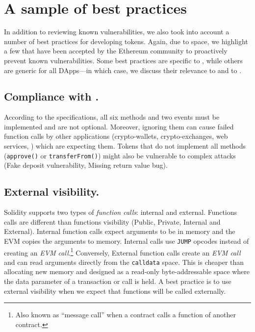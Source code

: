 
\section{A sample of best practices}\label{section:bp}

In addition to reviewing known vulnerabilities, we also took into account a number of best practices for developing \erc tokens. Again, due to space, we highlight a few that have been accepted by the Ethereum community to proactively prevent known vulnerabilities\cite{TokenBP}. Some best practices are specific to \erc, while others are generic for all DApps---in which case, we discuss their relevance to \erc and to \sys.

\subsection{Compliance with \erc.}

According to the \erc specifications, all six methods and two events must be implemented and are not optional. Moreover, ignoring them can cause failed function calls by other applications (\ie crypto-wallets, crypto-exchanges, web services, \etc) which are expecting them. Tokens that do not implement all methods (\eg \texttt{approve()} or \texttt{transferFrom()}) might also be vulnerable to complex attacks (\eg Fake deposit vulnerability\cite{DEPOSafe}, Missing return value bug\cite{ErcBug}).

\subsection{External visibility.}\label{subsec:external}

Solidity supports two types of \textit{function calls}: internal and external\cite{SolidityDoc}. { \blue Functions calls are different than functions visibility (\ie Public, Private, Internal and External).} Internal function calls expect arguments to be in memory and the EVM copies the arguments to memory. Internal calls use \texttt{JUMP} opcodes instead of creating an \textit{EVM call}.\footnote{Also known as ``message call'' when a contract calls a function of another contract.} Conversely, External function calls create an \textit{EVM call} and can read arguments directly from the \texttt{calldata} space. This is cheaper than allocating new memory and designed as a read-only byte-addressable space where the data parameter of a transaction or call is held\cite{EthInDepth}. A best practice is to use external visibility when we expect that functions will be called externally.

